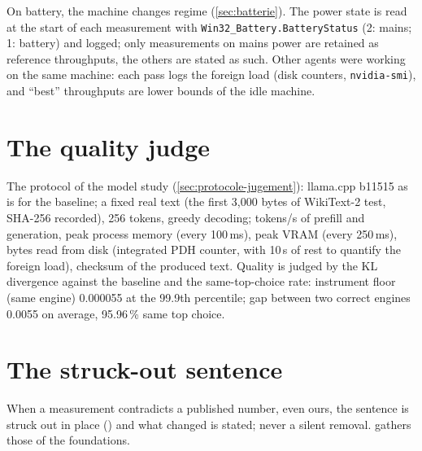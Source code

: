 On battery, the machine changes regime (\cref{sec:batterie}). The power state is read at the start of each measurement with \texttt{Win32\_Battery.BatteryStatus} (2: mains; 1: battery) and logged; only measurements on mains power are retained as reference throughputs, the others are stated as such. Other agents were working on the same machine: each pass logs the foreign load (disk counters, \texttt{nvidia-smi}), and ``best'' throughputs are lower bounds of the idle machine.

\section{The quality judge}\label{sec:protocole-qualite}

The protocol of the model study (\cref{sec:protocole-jugement}): llama.cpp b11515 as is for the baseline; a fixed real text (the first 3{,}000 bytes of WikiText-2 test, SHA-256 recorded), 256 tokens, greedy decoding; tokens/s of prefill and generation, peak process memory (every 100\,ms), peak VRAM (every 250\,ms), bytes read from disk (integrated PDH counter, with 10\,s of rest to quantify the foreign load), checksum of the produced text. Quality is judged by the KL divergence against the baseline and the same-top-choice rate: instrument floor (same engine) 0.000055 at the 99.9th percentile; gap between two correct engines 0.0055 on average, 95.96\,\% same top choice.

\section{The struck-out sentence}

When a measurement contradicts a published number, even ours, the sentence is struck out in place () and what changed is stated; never a silent removal.  gathers those of the foundations.
